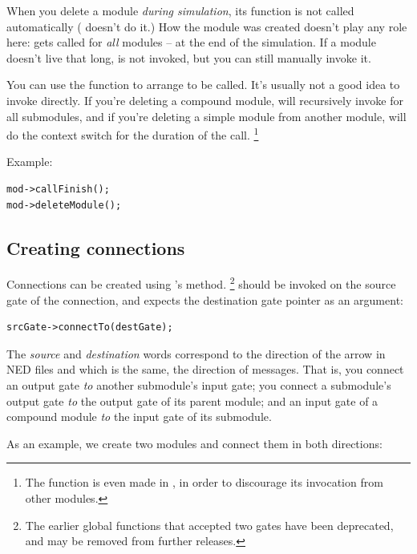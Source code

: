 When you delete a module \textit{during simulation}, its 
function is not called automatically ( doesn't do it.)
How the module was created doesn't play any role here:
 gets called for \textit{all} modules -- at the end of the
simulation. If a module doesn't live that long,  is not
invoked, but you can still manually invoke it.

You can use the  function to arrange 
to be called. It's usually not a good idea to invoke 
directly. If you're deleting a compound module,  will
recursively invoke  for all submodules, and if you're deleting
a simple module from another module,  will do the context
switch for the duration of the call.
  \footnote{The  function is even made 
  in , in order to discourage its invocation from
  other modules.}

Example:

\begin{verbatim}
mod->callFinish();
mod->deleteModule();
\end{verbatim}


\subsection{Creating connections}

Connections can be created using 's 
method.
  \footnote{The earlier  global functions that
  accepted two gates have been deprecated, and may be removed
  from further {\opp} releases.}
 should be invoked on the source gate
of the connection, and expects the destination gate pointer as
an argument:

\begin{verbatim}
srcGate->connectTo(destGate);
\end{verbatim}

The \textit{source} and \textit{destination} words correspond
to the direction of the arrow in NED files and which is the same,
the direction of messages. That is,
you connect an output gate \textit{to} another submodule's input gate;
you connect a submodule's output gate \textit{to} the output gate
of its parent module; and an input gate of a compound module
\textit{to} the input gate of its submodule.

As an example, we create two modules and connect them in both directions:

